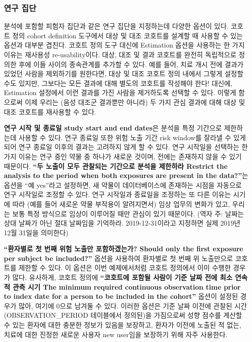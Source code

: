 \documentclass[10.5pt]{book}
\theoremstyle{definition}
\theoremstyle{definition}
\theoremstyle{definition}
\theoremstyle{remark}
\begin{document}
\subsubsection*{연구 집단}\label{-}

분석에 포함할 피험자 집단과 같은 연구 집단을 지정하는데 다양한 옵션이
있다. 코호트 정의 cohort definition 도구에서 대상 및 대조 코호트를
설계할 때 사용할 수 있는 옵션과 대부분 겹친다. 코호트 정의 도구 대신에
Estimation 옵션을 사용하는 한 가지 이유는 재사용성 re-usability이다.
대상, 대조 및 결과 코호트를 완전히 독립적으로 정의한 후에 이들 사이의
종속관계를 추가할 수 있다. 예를 들어, 치료 개시 전에 결과가 있었던
사람을 제외하기를 원한다면, 대상 및 대조 코호트 정의 내에서 그렇게
설정할 수도 있지만, 그보다는 모든 결과에 대해 별도의 코호트를 작성해야
한다! 대신에, Estimation 설정에서 이런 결과를 가진 사람을 제거하도록
선택할 수 있다. 이렇게 함으로써 이제 우리는 (음성 대조군 결과뿐만
아니라) 두 가지 관심 결과에 대해 대상 및 대조 코호트를 재사용할 수 있다.

\textbf{연구 시작 및 종료일 study start and end dates}은 분석을 특정
기간으로 제한하는데 사용할 수 있다. 연구 종료일 또한 위험 노출 기간 risk
window를 잘라낼 수 있게 되어 연구 종료일 이후의 결과는 고려하지 않게 할
수 있다. 연구 시작일을 선택하는 한 가지 이유는 연구 중인 약물 중 하나가
새로운 것이며, 전에는 존재하지 않을 수 있기 때문이다. \textbf{``두
노출이 모두 관찰되는 기간으로 분석을 제한하라 Restrict the analysis to
the period when both exposures are present in the data?''}는 옵션을 ``예
yes''라고 설정하면, 새 약물이 데이터베이스에 존재하는 시점을 자동으로
연구 시작일로 조정할 수 있다. 연구 시작일과 종료일을 조정하는 또 다른
이유는 시기에 따라 (예를 들어 새로운 약물 부작용이 알려지면서) 임상
업무의 변화가 있고, 우리는 보통 특정 방식으로 임상이 이루어질 때만
관심이 있기 때문이다. (역자 주: 날짜는 상대 날짜가 아닌 절대 날짜임을
기억하라. 2019-12-31이라고 지정하면 실제 2019년 12월 31일을 의미한다)

\textbf{``환자별로 첫 번째 위험 노출만 포함하겠는가? Should only the
first exposure per subject be included?''} 옵션을 사용하여 환자별로 첫
번째 위 노출만으로 코호트를 제한할 수 있다. 이 옵션은 이번 예제에서처럼
코호트 정의에서 이미 수행한 경우가 많다. 유사하게, 코호트 정의에
\textbf{``코호트에 포함될 사람이 기준 날짜 전에 최소 연속적 관측 시기
The minimum required continuous observation time prior to index date for
a person to be included in the cohort''} 옵션이 설정된 경우가 많아,
여기에 0으로 남겨둘 수 있다. 이러한 옵션은 기준 날짜 이전에 관찰된 시간
(OBSERVATION\_PERIOD 테이블에서 정의된)을 가짐으로써 성향 점수를 계산할
수 있는 환자에 대한 충분한 정보가 있음을 보장하고, 환자가 이전에 노출된
적 없는, 치료에 대한 진정한 새로운 사용자 new user임을 보장하기 위해
자주 사용한다.
\end{document}
